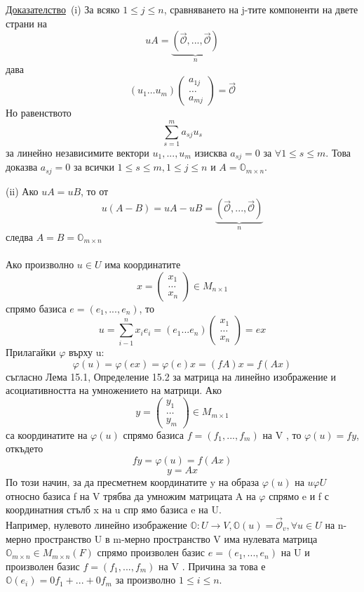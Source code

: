 \documentclass{article}
\newcommand*{\nullvec}{\vec{\mathcal{O}}}
\newcommand{\dok}{\underline{Доказателство}\  }
\begin{document}
\dok(i) За всяко $1 \leq j \leq n$, сравняването на j-тите компоненти на двете страни на
\[
    uA = \underbrace{(\nullvec,...,\nullvec)}_{n}
\]
дава
\[
    (u_1 \dots u_m)\left(\begin{array}{c}
            a_{1j} \\
            \dots  \\
            a_{mj}
        \end{array}\right)=\nullvec
\]
Но равенството
\[
    \sum_{s=1}^{m}a_{sj}u_s
\]
за линейно независимите вектори $u_1,..., u_m$ изисква $a_{sj} = 0$ за $\forall 1 \leq s \leq m$.
Това доказва $a_{sj} = 0$ за всички $1 \leq s \leq m, 1 \leq j \leq n$ и $A = \mathbb{O}_{m\times n}$.

(ii) Ако $uA = uB$, то от
\[
    u(A-B)=uA-uB=\underbrace{(\nullvec,...,\nullvec)}_{n}
\]
следва $A=B=\mathbb{O}_{m\times n}$\\ \\
Ако произволно $u\in U$ има координатите
\[
    x = \left(\begin{array}{c}
            x_1   \\
            \dots \\
            x_n
        \end{array}
    \right)\in M_{n\times 1}
\]
спрямо базиса $e=(e_1,...,e_n)$, то
\[
    u=\sum_{i-1}^{n}x_ie_i=(e_1 ... e_n)\left(\begin{array}{c}
            x_1   \\
            \dots \\
            x_n
        \end{array}
    \right)=ex
\]
Прилагайки $\varphi$ върху u:
\[
    \varphi(u)=\varphi(ex)=\varphi(e)x=(fA)x=f(Ax)
\]
съгласно Лема 15.1, Определение 15.2 за матрица на линейно изображение и
асоциативността на умножението на матрици. Ако
\[
    y = \left(\begin{array}{c}
            y_1   \\
            \dots \\
            y_m
        \end{array}
    \right)\in M_{m\times 1}
\]
са координатите на $\varphi(u)$ спрямо базиса $f = (f_1, . . . , f_m)$ на V , то $\varphi(u) = fy$,
откъдето
\[
    fy=\varphi(u)=f(Ax)
\]
\[
    y=Ax
\]
По този начин, за да пресметнем координатите y на образа $\varphi(u)$ на $u \varphi U$
относно базиса f на V трябва да умножим матрицата A на $\varphi$ спрямо e и f с
координатния стълб x на u спр ямо базиса e на U.\\
Например, нулевото линейно изображение $\mathbb{O} : U \rightarrow V , \mathbb{O}(u) = \nullvec_v , \forall u \in U$
на n-мерно пространство U в m-мерно пространство V има нулевата матрица
$\mathbb{O}_{m\times n} \in M_{m\times n}(F)$ спрямо произволен базис $e = (e_1, . . . , e_n)$ на U и произволен
базис $f = (f_1, . . . , f_m)$ на V . Причина за това е $\mathbb{O}(e_i) = 0f_1 + . . . + 0f_m$ за
произволно $1 \leq i \leq n$.
\end{document}
